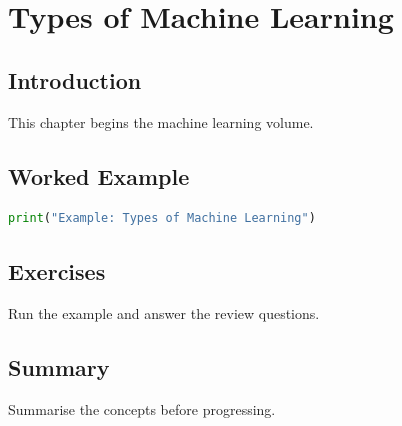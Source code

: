 \chapter{Types of Machine Learning}
\label{chap:vol6-2}



\section{Introduction}
This chapter begins the machine learning volume.

\section{Worked Example}
\begin{lstlisting}[language=Python]
print("Example: Types of Machine Learning")
\end{lstlisting}

\section{Exercises}
\begin{exercise}
Run the example and answer the review questions.
\end{exercise}

\section{Summary}
Summarise the concepts before progressing.
